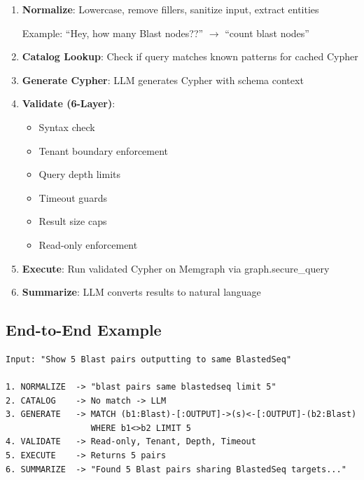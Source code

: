 \documentclass[a4paper,twoside]{sapthesis}
\begin{document}
\begin{enumerate}
    \item \textbf{Normalize}: Lowercase, remove fillers, sanitize input, extract entities
    
    Example: ``Hey, how many Blast nodes??'' $\rightarrow$ ``count blast nodes''
    
    \item \textbf{Catalog Lookup}: Check if query matches known patterns for cached Cypher
    
    \item \textbf{Generate Cypher}: LLM generates Cypher with schema context
    
    \item \textbf{Validate (6-Layer)}: 
    \begin{itemize}
        \item Syntax check
        \item Tenant boundary enforcement
        \item Query depth limits
        \item Timeout guards
        \item Result size caps
        \item Read-only enforcement
    \end{itemize}
    
    \item \textbf{Execute}: Run validated Cypher on Memgraph via graph.secure\_query
    
    \item \textbf{Summarize}: LLM converts results to natural language
\end{enumerate}

\subsection{End-to-End Example}
\label{subsec:nl2cypher-example}

\begin{lstlisting}[caption={NL-to-Cypher pipeline example}]
Input: "Show 5 Blast pairs outputting to same BlastedSeq"

1. NORMALIZE  -> "blast pairs same blastedseq limit 5"
2. CATALOG    -> No match -> LLM
3. GENERATE   -> MATCH (b1:Blast)-[:OUTPUT]->(s)<-[:OUTPUT]-(b2:Blast) 
                 WHERE b1<>b2 LIMIT 5
4. VALIDATE   -> Read-only, Tenant, Depth, Timeout
5. EXECUTE    -> Returns 5 pairs
6. SUMMARIZE  -> "Found 5 Blast pairs sharing BlastedSeq targets..."
\end{lstlisting}
\end{document}
